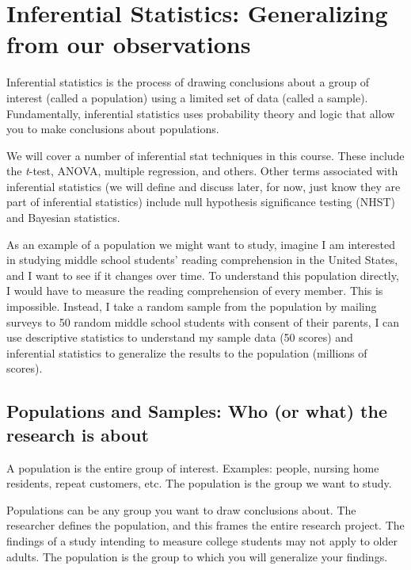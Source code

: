 \documentclass[
]{book}
\begin{document}
\hypertarget{inferential-statistics-generalizing-from-our-observations}{%
\section{Inferential Statistics: Generalizing from our observations}\label{inferential-statistics-generalizing-from-our-observations}}

Inferential statistics is the process of drawing conclusions about a group of interest (called a population) using a limited set of data (called a sample). Fundamentally, inferential statistics uses probability theory and logic that allow you to make conclusions about populations.

We will cover a number of inferential stat techniques in this course. These include the \emph{t}-test, ANOVA, multiple regression, and others. Other terms associated with inferential statistics (we will define and discuss later, for now, just know they are part of inferential statistics) include null hypothesis significance testing (NHST) and Bayesian statistics.

As an example of a population we might want to study, imagine I am interested in studying middle school students' reading comprehension in the United States, and I want to see if it changes over time. To understand this population directly, I would have to measure the reading comprehension of every member. This is impossible. Instead, I take a random sample from the population by mailing surveys to 50 random middle school students with consent of their parents, I can use descriptive statistics to understand my sample data (50 scores) and inferential statistics to generalize the results to the population (millions of scores).

\hypertarget{populations-and-samples-who-or-what-the-research-is-about}{%
\subsection{Populations and Samples: Who (or what) the research is about}\label{populations-and-samples-who-or-what-the-research-is-about}}

A population is the entire group of interest. Examples: people, nursing home residents, repeat customers, etc. The population is the group we want to study.

Populations can be any group you want to draw conclusions about. The researcher defines the population, and this frames the entire research project. The findings of a study intending to measure college students may not apply to older adults. The population is the group to which you will generalize your findings.
\end{document}
